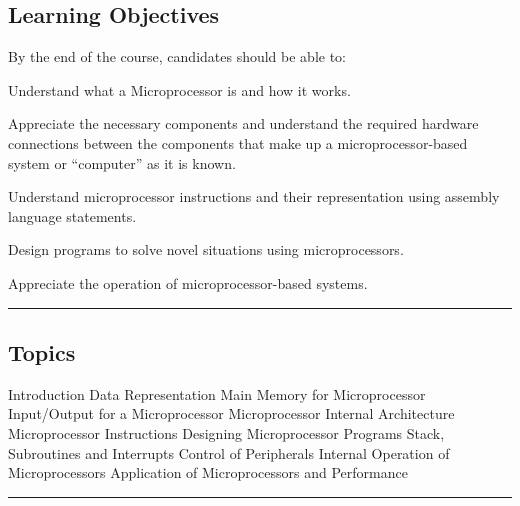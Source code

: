 \subsection*{Learning Objectives}
By the end of the course, candidates should be able to:
\begin{outline}
    \1      Understand what a Microprocessor is and how it works.

    \1  	Appreciate the necessary components and understand the required hardware connections between the components that make up a microprocessor-based system or “computer” as it is known.

    \1  	Understand microprocessor instructions and their representation using assembly language statements.

    \1  	Design programs to solve novel situations using microprocessors.

    \1  	Appreciate the operation of microprocessor-based systems.

\end{outline}
\vspace{2ex}\hrule\vspace{2ex}

\subsection*{Topics}
\begin{outline}
    \1 Introduction
    \1 Data Representation
    \1 Main Memory for Microprocessor
    \1 Input/Output for a Microprocessor
    \1 Microprocessor Internal Architecture
    \1 Microprocessor Instructions
    \1 Designing Microprocessor Programs
    \1 Stack, Subroutines and Interrupts
    \1 Control of Peripherals
    \1 Internal Operation of Microprocessors
    \1 Application of Microprocessors and Performance
\end{outline}
\vspace{2ex} \hrule\vspace{2ex}

